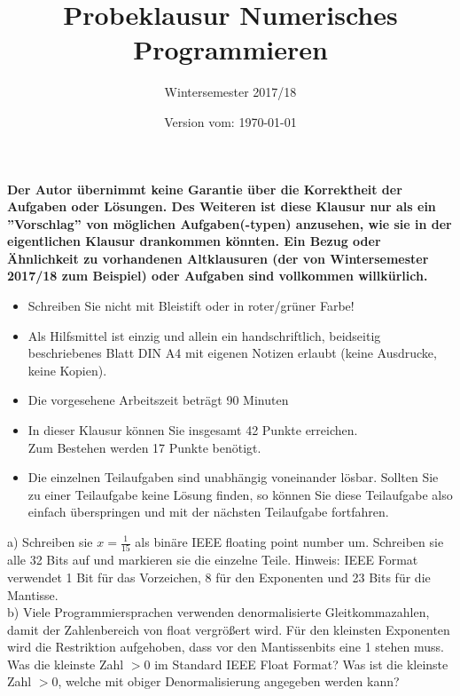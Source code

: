 \documentclass{scrartcl}
\begin{document}
\title{Probeklausur Numerisches Programmieren}
\subtitle{Wintersemester 2017/18}
\author{\npauthor{}}
\date{Version vom: \today}
\maketitle

\textbf{Der Autor übernimmt keine Garantie über die Korrektheit der Aufgaben oder Lösungen. \n Des Weiteren ist diese Klausur nur als ein ''Vorschlag'' von möglichen Aufgaben(-typen) anzusehen, wie sie in der eigentlichen Klausur drankommen könnten. Ein Bezug oder Ähnlichkeit zu vorhandenen Altklausuren (der von Wintersemester 2017/18 zum Beispiel) oder Aufgaben sind vollkommen willkürlich.}
\sbreak

\begin{itemize}
	\item Schreiben Sie nicht mit Bleistift oder in roter/grüner Farbe!
	\item Als Hilfsmittel ist einzig und allein ein handschriftlich, beidseitig beschriebenes Blatt DIN A4 mit eigenen Notizen erlaubt (keine Ausdrucke, keine Kopien).
	\item Die vorgesehene Arbeitszeit beträgt 90 Minuten
	\item In dieser Klausur können Sie insgesamt 42 Punkte erreichen. \\Zum Bestehen werden 17 Punkte benötigt.
	\item Die einzelnen Teilaufgaben sind unabhängig voneinander lösbar.
	Sollten Sie zu einer Teilaufgabe keine Lösung finden, so können Sie diese Teilaufgabe also einfach überspringen und mit der nächsten Teilaufgabe fortfahren.
\end{itemize}


	a) 
	Schreiben sie $x = \frac{1}{15}$ als binäre IEEE floating point number um. Schreiben sie alle 32 Bits auf und markieren sie die einzelne Teile.
	\n
	Hinweis: IEEE Format verwendet 1 Bit für das Vorzeichen, 8 für den Exponenten und 23 Bits für die Mantisse. 
	\lbreak \lbreak \lbreak \lbreak \lbreak
	\\
	b) 
	Viele Programmiersprachen verwenden denormalisierte Gleitkommazahlen, damit der Zahlenbereich von float vergrößert wird. Für den kleinsten Exponenten wird die Restriktion aufgehoben, dass vor den Mantissenbits eine 1 stehen muss.
	\n 
	Was die kleinste Zahl $>0$ im Standard IEEE Float Format?
	\n 
	Was ist die kleinste Zahl $>0$, welche mit obiger Denormalisierung angegeben werden kann?
	
\end{document}
